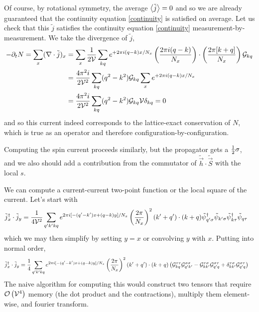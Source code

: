 Of course, by rotational symmetry, the average $\left\langle \tilde{j} \right\rangle=0$ and so we are already guaranteed that the continuity equation \eqref{continuity} is satisfied on average.
Let us check that this $\tilde{j}$ satisfies the continuity equation \eqref{continuity} measurement-by-measurement.
We take the divergence of $\tilde{j}$,
\begin{align}
	-\partial_t N = \sum_x (\nabla\cdot \tilde{j})_x
	&=
	\sum_x \frac{1}{2\mathcal{V}} \sum_{kq} e^{+2\pi i (q-k) x / N_x} \left(\frac{2\pi i(q-k)}{N_x}\right) \cdot \left(\frac{2\pi [ k+q ]}{N_x}\right)
		\mathcal{G}_{kq}
	\nonumber\\
	&=
	\frac{4\pi^2i}{2\mathcal{V}^2} \sum_{kq}  (q^2-k^2)
		\mathcal{G}_{kq} \sum_x e^{+2\pi i (q-k) x / N_x}
	\nonumber\\
	&=
	\frac{4\pi^2i}{2\mathcal{V}^2} \sum_{kq}  (q^2-k^2)
		\mathcal{G}_{kq} \mathcal{V} \delta_{kq} = 0
\end{align}
and so this current indeed corresponds to the lattice-exact conservation of $N$, which is true as an operator and therefore configuration-by-configuration.

Computing the spin current proceeds similarly, but the propagator gets a $\frac{1}{2} \sigma$, and we also should add a contribution from the commutator of $\tilde{\vec{h}}\cdot\tilde{\vec{S}}$ with the local $s$.

We can compute a current-current two-point function or the local square of the current.
Let's start with
\begin{align}
	\tilde{j}{}^{\dagger}_x \cdot \tilde{j}_y
	&=
	\frac{1}{4\mathcal{V}^2}\sum_{q'k'kq} e^{2\pi i[ -(q'-k')x + (q-k) y]/N_x} \left(\frac{2\pi}{N_x}\right)^2 (k'+q')\cdot(k+q)
	\tilde{\psi}{}^{\dagger}_{q'\sigma} \tilde{\psi}_{k'\sigma} \tilde{\psi}{}^{\dagger}_{k\tau} \tilde{\psi}_{q\tau}
\end{align}
which we may then simplify by setting $y=x$ or convolving $y$ with $x$.
Putting into normal order,
\begin{align}
	\tilde{j}{}^{\dagger}_x \cdot \tilde{j}_y
	&=
	\frac{1}{4}\sum_{q'k'kq} e^{2\pi i[ -(q'-k')x + (q-k) y]/N_x} \left(\frac{2\pi}{N_x}\right)^2 (k'+q')\cdot(k+q)
	\left(\mathcal{G}^{\tau\tau}_{kq}\mathcal{G}^{\sigma\sigma}_{q'k'} - \mathcal{G}^{\tau\sigma}_{kk'} \mathcal{G}^{\sigma\tau}_{q'q} + \delta^{\tau\sigma}_{kk'} \mathcal{G}^{\sigma\tau}_{q'q}\right)
	\label{eq:jj normal order}
\end{align}
The naive algorithm for computing this would construct two tensors that require $\mathcal{O}\left(\mathcal{V}^4\right)$ memory (the dot product and the contractions), multiply them element-wise, and fourier transform.

